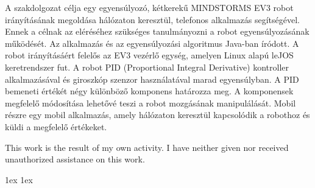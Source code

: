 \documentclass[final]{ubb_dolgozat}
\author{
Márton Zete-Örs
}
\begin{document}
\begin{abstractEN}
	
A szakdolgozat célja egy egyensúlyozó, kétkerekű MINDSTORMS EV3 robot irányításának megoldása hálózaton keresztül, telefonos alkalmazás segítségével. Ennek a célnak az eléréséhez szükséges tanulmányozni a robot egyensúlyozásának működését. Az alkalmazás és az egyensúlyozási algoritmus Java-ban íródott. A robot irányításáért felelős az EV3 vezérlő egység, amelyen Linux alapú leJOS keretrendszer fut. A robot PID (Proportional Integral Derivative) kontroller alkalmazásával és giroszkóp szenzor használatával marad egyensúlyban. A PID bemeneti értékét négy különböző komponens határozza meg. A komponensek megfelelő módosítása lehetővé teszi a robot mozgásának manipulálását. Mobil részre egy mobil alkalmazás, amely hálózaton keresztül kapcsolódik a robothoz és küldi a megfelelő értékeket.

This work is the result of my own activity. I have neither given nor received unauthorized assistance on this work.

\end{abstractEN}

\maketitle

{ \baselineskip 1ex
  \parskip 1ex
  \tableofcontents
}




%
%
%
%
\appendix

{ \renewcommand{\baselinestretch}{1.1}\normalsize %
	\setlength{\itemsep}{-2.4mm}
	\setlength{\bibspacing}{0.67\baselineskip}
	
	
}
\end{document}
